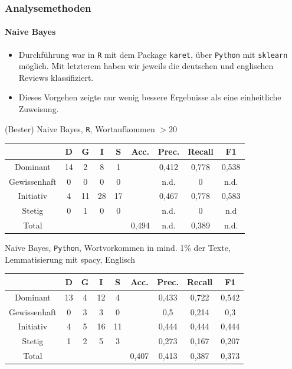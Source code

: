 \documentclass{beamer}
\begin{document}
\begin{frame}
\frametitle{Analysemethoden}
\framesubtitle{Naive Bayes}
\begin{itemize}\itemsep12pt
\item Durchführung war in \texttt{R} mit dem Package \texttt{karet}, über \texttt{Python} mit \texttt{sklearn} möglich. Mit letzterem haben wir jeweils die deutschen und englischen Reviews klassifiziert.
\item Dieses Vorgehen zeigte nur wenig bessere Ergebnisse als eine einheitliche Zuweisung.
\end{itemize}
\begin{center}
(Bester) Naive Bayes, \texttt{R}, Wortaufkommen $> 20$\
\begin{tabular}{|c|c|c|c|c|c|c|c|c|}
\hline
				& D 	& G	& I & S	& Acc.	& Prec. & Recall	& F1\\
\hline
Dominant 		& 14		& 2 			& 8 		& 1 		&       	& 0,412 	& 0,778 	& 0,538\\
Gewissenhaft 	& 0 		& 0 			& 0 		& 0 		& 			& n.d. 		& 0 	& n.d.\\
Initiativ 		& 4 		& 11			& 28		& 17		& 			& 0,467	& 0,778 	& 0,583\\
Stetig 			& 0 		& 1 			& 0 		& 0 		& 			& n.d.	   		& 0 	& n.d\\
\hline
Total 			& 			& 				& 			& 			& 0,494		& n.d. 		& 0,389  	& n.d.\\
\hline
\end{tabular}
\end{center}
\end{frame}

\begin{frame}
\begin{center}
Naive Bayes, \texttt{Python}, Wortvorkommen in mind. 1\% der Texte,\\
Lemmatisierung mit spacy, Englisch\
\begin{tabular}{|c|c|c|c|c|c|c|c|c|}
\hline
 & D 	& G	& I & S	& Acc.	& Prec. & Recall	& F1\\
\hline
Dominant & 13 & 4 & 12 & 4 & & 0,433 & 0,722 & 0,542\\
Gewissenhaft & 0 & 3 & 3 & 0 & & 0,5 & 0,214 & 0,3\\
Initiativ & 4 & 5 & 16 & 11 & & 0,444 & 0,444 & 0,444\\
Stetig & 1 & 2 & 5 & 3 & & 0,273 & 0,167 & 0,207\\
\hline
Total  &   &   &   &   & 0,407 & 0,413  & 0,387   & 0,373\\
\hline
\end{tabular}
\end{center}
\end{frame}
\end{document}
